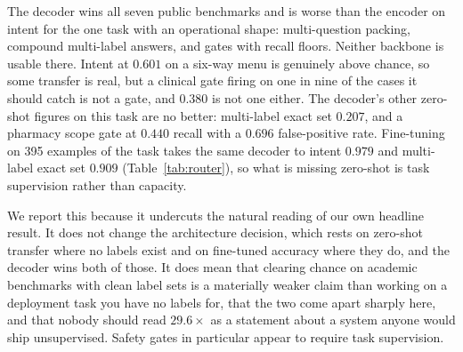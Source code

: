 The decoder wins all seven public benchmarks and is worse than the encoder
on intent for the one task with an operational shape: multi-question
packing, compound multi-label answers, and gates with recall floors.
Neither backbone is usable there. Intent at $0.601$ on a six-way menu is
genuinely above chance, so some transfer is real, but a clinical gate
firing on one in nine of the cases it should catch is not a gate, and
$0.380$ is not one either. The decoder's other zero-shot figures on this
task are no better: multi-label exact set $0.207$, and a pharmacy scope
gate at $0.440$ recall with a $0.696$ false-positive rate. Fine-tuning on
395 examples of the task takes the same decoder to intent $0.979$ and
multi-label exact set $0.909$ (Table~\ref{tab:router}), so what is missing
zero-shot is task supervision rather than capacity.

We report this because it undercuts the natural reading of our own
headline result. It does not change the architecture decision, which rests
on zero-shot transfer where no labels exist and on fine-tuned accuracy
where they do, and the decoder wins both of those. It does mean that
clearing chance on academic benchmarks with clean label sets is a
materially weaker claim than working on a deployment task you have no
labels for, that the two come apart sharply here, and that nobody should
read $29.6\times$ as a statement about a system anyone would ship
unsupervised. Safety gates in particular appear to require task
supervision.
